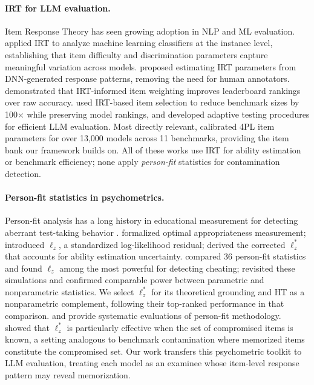 \paragraph{IRT for LLM evaluation.}
Item Response Theory has seen growing adoption in NLP and ML evaluation.
\citet{martinezplumed2019} applied IRT to analyze machine learning classifiers at the instance level, establishing that item difficulty and discrimination parameters capture meaningful variation across models.
\citet{lalor2019} proposed estimating IRT parameters from DNN-generated response patterns, removing the need for human annotators.
\citet{rodriguez2021} demonstrated that IRT-informed item weighting improves leaderboard rankings over raw accuracy.
\citet{polo2024tinybenchmarks} used IRT-based item selection to reduce benchmark sizes by 100$\times$ while preserving model rankings, and \citet{atlas2025} developed adaptive testing procedures for efficient LLM evaluation.
Most directly relevant, \citet{psnirt2026} calibrated 4PL item parameters for over 13,000 models across 11 benchmarks, providing the item bank our framework builds on.
All of these works use IRT for ability estimation or benchmark efficiency; none apply \emph{person-fit} statistics for contamination detection.

\paragraph{Person-fit statistics in psychometrics.}
Person-fit analysis has a long history in educational measurement for detecting aberrant test-taking behavior \citep[see][for a textbook treatment]{embretson2000}.
\citet{levine1988} formalized optimal appropriateness measurement; \citet{drasgow1985} introduced $\ell_z$, a standardized log-likelihood residual; \citet{snijders2001} derived the corrected $\ell_z^*$ that accounts for ability estimation uncertainty.
\citet{karabatsos2003} compared 36 person-fit statistics and found $\ell_z$ among the most powerful for detecting cheating; \citet{sinharay2017personfit} revisited these simulations and confirmed comparable power between parametric and nonparametric statistics.
We select $\ell_z^*$ for its theoretical grounding and HT \citep{vanderflier1982} as a nonparametric complement, following their top-ranked performance in that comparison.
\citet{reise1990} and \citet{meijer2001} provide systematic evaluations of person-fit methodology.
\citet{sinharay2017} showed that $\ell_z^*$ is particularly effective when the set of compromised items is known, a setting analogous to benchmark contamination where memorized items constitute the compromised set.
Our work transfers this psychometric toolkit to LLM evaluation, treating each model as an examinee whose item-level response pattern may reveal memorization.
